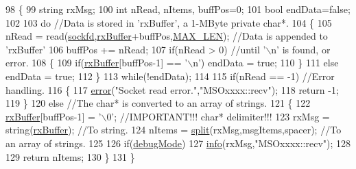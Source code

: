 \begin{DoxyCode}
98 \{
99     \textcolor{keywordtype}{string} rxMsg;
100     \textcolor{keywordtype}{int} nRead, nItems, buffPos=0;
101     \textcolor{keywordtype}{bool} endData=\textcolor{keyword}{false};
102 
103     \textcolor{keywordflow}{do}          \textcolor{comment}{//Data is stored in 'rxBuffer', a 1-MByte private char*.}
104     \{
105         nRead = read(\hyperlink{classMSOxxxx_acf030a8f1ddd78d632816c856f50455c}{sockfd},\hyperlink{classMSOxxxx_a1a50770759caada18087ca8ffb96f357}{rxBuffer}+buffPos,\hyperlink{MSOxxxx_8h_aabf4f709c8199e41cf279c77112345fe}{MAX\_LEN}); \textcolor{comment}{//Data is appended to
       'rxBuffer'}
106         buffPos += nRead;
107         \textcolor{keywordflow}{if}(nRead > 0)                                                                       \textcolor{comment}{//until '\(\backslash\)n' is
       found, or error.}
108         \{
109             \textcolor{keywordflow}{if}(\hyperlink{classMSOxxxx_a1a50770759caada18087ca8ffb96f357}{rxBuffer}[buffPos-1] == \textcolor{charliteral}{'\(\backslash\)n'}) endData = \textcolor{keyword}{true};
110         \}
111         \textcolor{keywordflow}{else} endData = \textcolor{keyword}{true};
112     \}
113     \textcolor{keywordflow}{while}(!endData); 
114 
115     \textcolor{keywordflow}{if}(nRead == -1)                                                                     \textcolor{comment}{//Error handling.}
116     \{
117         \hyperlink{classObject_a204a95f57818c0f811933917a30eff45}{error}(\textcolor{stringliteral}{"Socket read error."},\textcolor{stringliteral}{"MSOxxxx::recv"});
118         \textcolor{keywordflow}{return} -1;
119     \}
120     \textcolor{keywordflow}{else}                                                                                    \textcolor{comment}{//The char* is
       converted to an array of strings.}
121     \{
122         \hyperlink{classMSOxxxx_a1a50770759caada18087ca8ffb96f357}{rxBuffer}[buffPos-1] = \textcolor{charliteral}{'\(\backslash\)0'};                                 \textcolor{comment}{//IMPORTANT!!! char*
       delimiter!!!}
123         rxMsg = string(\hyperlink{classMSOxxxx_a1a50770759caada18087ca8ffb96f357}{rxBuffer});                                       \textcolor{comment}{//To string.}
124         nItems = \hyperlink{classMSOxxxx_a46726c6d181a758bb4f598c66f336236}{split}(rxMsg,msgItems,spacer);         \textcolor{comment}{//To an array of strings.}
125 
126         \textcolor{keywordflow}{if}(\hyperlink{classMSOxxxx_a826ba82e93bbe5780169107a31dbfd29}{debugMode})
127             \hyperlink{classObject_a644fd329ea4cb85f54fa6846484b84a8}{info}(rxMsg,\textcolor{stringliteral}{"MSOxxxx::recv"});
128 
129         \textcolor{keywordflow}{return} nItems;
130     \}
131 \}
\end{DoxyCode}
\mbox{\label{classAttrib_a7d4ef7e32d93cb287792b87b857e79f3}} 
